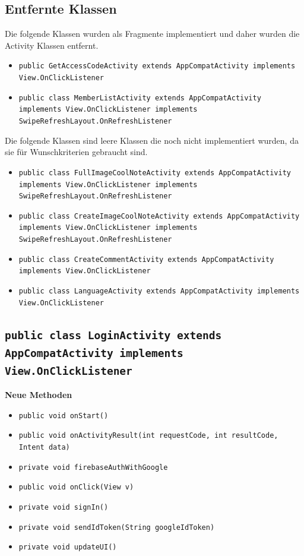 \documentclass[a4paper]{scrreprt}
\begin{document}
		\subsection{Entfernte Klassen}
			Die folgende Klassen wurden als Fragmente implementiert und daher wurden die Activity Klassen entfernt.
			\begin{itemize}
				\item \texttt{public GetAccessCodeActivity extends AppCompatActivity implements View.OnClickListener}
				\item \texttt{public class MemberListActivity extends AppCompatActivity implements View.OnClickListener implements SwipeRefreshLayout.OnRefreshListener}
			\end{itemize}
			Die folgende Klassen sind leere Klassen die noch nicht implementiert wurden, da sie für Wunschkriterien gebraucht sind.
			\begin{itemize}
				\item \texttt{public class FullImageCoolNoteActivity extends AppCompatActivity implements View.OnClickListener implements SwipeRefreshLayout.OnRefreshListener}
				\item \texttt{public class CreateImageCoolNoteActivity extends AppCompatActivity implements View.OnClickListener implements SwipeRefreshLayout.OnRefreshListener}
				\item \texttt{public class CreateCommentActivity extends AppCompatActivity implements View.OnClickListener}
				\item \texttt{public class LanguageActivity extends AppCompatActivity implements View.OnClickListener}
			\end{itemize}
		\subsection{\texttt{public class LoginActivity extends AppCompatActivity implements View.OnClickListener}}
			\textbf{Neue Methoden}
			\begin{itemize}
				\item \texttt{public void onStart()}
				\item \texttt{public void onActivityResult(int requestCode, int resultCode, Intent data)}
				\item \texttt{private void firebaseAuthWithGoogle}
				\item \texttt{public void onClick(View v)}
				\item \texttt{private void signIn()}
				\item \texttt{private void sendIdToken(String googleIdToken)}
				\item \texttt{private void updateUI()}
			\end{itemize}
\end{document}
